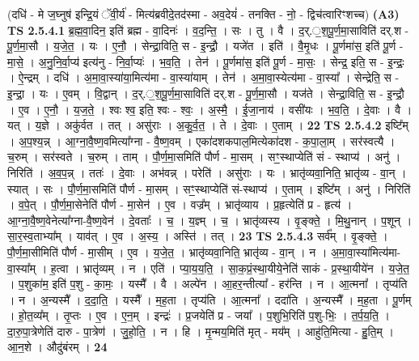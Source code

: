 \documentclass[17pt]{extarticle}
\begin{document}
                  \newline
                      (दधि॑ - मे ज॒घ्नुष॑ इन्द्रि॒यं ॅवी॒र्य॑ - मित्य॑ब्रवीदे॒तद॑स्मा - अव॒देयं॑ - तनक्ति - नो॒ - द्विच॑त्वारिꣳशच्च)  \textbf{(A3)} \newline \newline
                                \textbf{ TS 2.5.4.1} \newline
                  ब्र॒ह्म॒वा॒दिन॒ इति॑ ब्रह्म - वा॒दिनः॑ । व॒द॒न्ति॒ । सः । तु । वै । द॒र्.॒श॒पू॒र्ण॒मा॒साविति॑ दर्.श - पू॒र्ण॒मा॒सौ । य॒जे॒त॒ । यः । ए॒नौ॒ । सेन्द्रा॒विति॒ स - इ॒न्द्रौ॒ । यजे॑त । इति॑ । वै॒मृ॒धः । पू॒र्णमा॑स॒ इति॑ पू॒र्ण - मा॒से॒ । अ॒नु॒नि॒र्वा॒प्य॑ इत्य॑नु - नि॒र्वा॒प्यः॑ । भ॒व॒ति॒ । तेन॑ । पू॒र्णमा॑स॒ इति॑ पू॒र्ण - मा॒सः॒ । सेन्द्र॒ इति॒ स - इ॒न्द्रः॒ । ऐ॒न्द्रम् । दधि॑ । अ॒मा॒वा॒स्या॑या॒मित्य॑मा - वा॒स्या॑याम् । तेन॑ । अ॒मा॒वा॒स्येत्य॑मा - वा॒स्या᳚ । सेन्द्रेति॒ स - इ॒न्द्रा॒ । यः । ए॒वम् । वि॒द्वान् । द॒र्.॒श॒पू॒र्ण॒मा॒साविति॑ दर्.श - पू॒र्ण॒मा॒सौ । यज॑ते । सेन्द्रा॒विति॒ स - इ॒न्द्रौ॒ । ए॒व । ए॒नौ॒ । य॒ज॒ते॒ । श्वः श्व॒ इति॒ श्वः - श्वः॒ । अ॒स्मै॒ । ई॒जा॒नाय॑ । वसी॑यः । भ॒व॒ति॒ । दे॒वाः । वै । यत् । य॒ज्ञे । अकु॑र्वत । तत् । असु॑राः । अ॒कु॒र्व॒त॒ । ते । दे॒वाः । ए॒ताम् । \textbf{  22} \newline
                  \newline
                                \textbf{ TS 2.5.4.2} \newline
                  इष्टि᳚म् । अ॒प॒श्य॒न्न् । आ॒ग्ना॒वै॒ष्ण॒वमित्या᳚ग्ना - वै॒ष्ण॒वम् । एका॑दशकपाल॒मित्येका॑दश - क॒पा॒ला॒म् । सर॑स्वत्यै । च॒रुम् । सर॑स्वते । च॒रुम् । ताम् । पौ॒र्ण॒मा॒समिति॑ पौर्ण - मा॒सम् । सꣳ॒॒स्थाप्येति॑ सं - स्थाप्य॑ । अनु॑ । निरिति॑ । अ॒व॒प॒न्न् । ततः॑ । दे॒वाः । अभ॑वन्न् । परेति॑ । असु॑राः । यः । भ्रातृ॑व्यवा॒निति॒ भ्रातृ॑व्य - वा॒न् । स्यात् । सः । पौ॒र्ण॒मा॒समिति॑ पौर्ण - मा॒सम् । सꣳ॒॒स्थाप्येति॑ सं-स्थाप्य॑ । ए॒ताम् । इष्टि᳚म् । अनु॑ । निरिति॑ । व॒पे॒त् । पौ॒र्ण॒मा॒सेनेति॑ पौर्ण - मा॒सेन॑ । ए॒व । वज्र᳚म् । भ्रातृ॑व्याय । प्र॒हृत्येति॑ प्र - हृत्य॑ । आ॒ग्ना॒वै॒ष्ण॒वेनेत्या᳚ग्ना-वै॒ष्ण॒वेन॑ । दे॒वताः᳚ । च॒ । य॒ज्ञ्म् । च॒ । भ्रातृ॑व्यस्य । वृ॒ङ्क्ते॒ । मि॒थु॒नान् । प॒शून् । सा॒र॒स्व॒ताभ्या᳚म् । याव॑त् । ए॒व । अ॒स्य॒ । अस्ति॑ । तत् । \textbf{  23} \newline
                  \newline
                                \textbf{ TS 2.5.4.3} \newline
                  सर्व᳚म् । वृ॒ङ्क्ते॒ । पौ॒र्ण॒मा॒सीमिति॑ पौर्ण - मा॒सीम् । ए॒व । य॒जे॒त॒ । भ्रातृ॑व्यवा॒निति॒ भ्रातृ॑व्य - वा॒न् । न । अ॒मा॒वा॒स्या॑मित्य॑मा-वा॒स्या᳚म् । ह॒त्वा । भ्रातृ॑व्यम् । न । एति॑ । प्या॒य॒य॒ति॒ । सा॒क॒प्रं॒स्था॒यीये॒नेति॑ साकं - प्र॒स्था॒यीये॑न । य॒जे॒त॒ । प॒शुका॑म॒ इति॑ प॒शु - का॒मः॒ । यस्मै᳚ । वै । अल्पे॑न । आ॒हर॒न्तीत्या᳚ - हर॑न्ति । न । आ॒त्मना᳚ । तृप्य॑ति । न । अ॒न्यस्मै᳚ । द॒दा॒ति॒ । यस्मै᳚ । म॒ह॒ता । तृप्य॑ति । आ॒त्मना᳚ । ददा॑ति । अ॒न्यस्मै᳚ । म॒ह॒ता । पू॒र्णम् । हो॒त॒व्य᳚म् । तृ॒प्तः । ए॒व । ए॒न॒म् । इन्द्रः॑ । प्र॒जयेति॑ प्र - जया᳚ । प॒शुभि॒रिति॑ प॒शु-भिः॒ । त॒र्प॒य॒ति॒ । दा॒रु॒पा॒त्रेणेति॑ दारु - पा॒त्रेण॑ । जु॒हो॒ति॒ । न । हि । मृ॒न्मय॒मिति॑ मृत् - मय᳚म् । आहु॑ति॒मित्या - हु॒ति॒म् । आ॒न॒शे । औदु॑बंरम् । \textbf{  24} \newline
\end{document}
